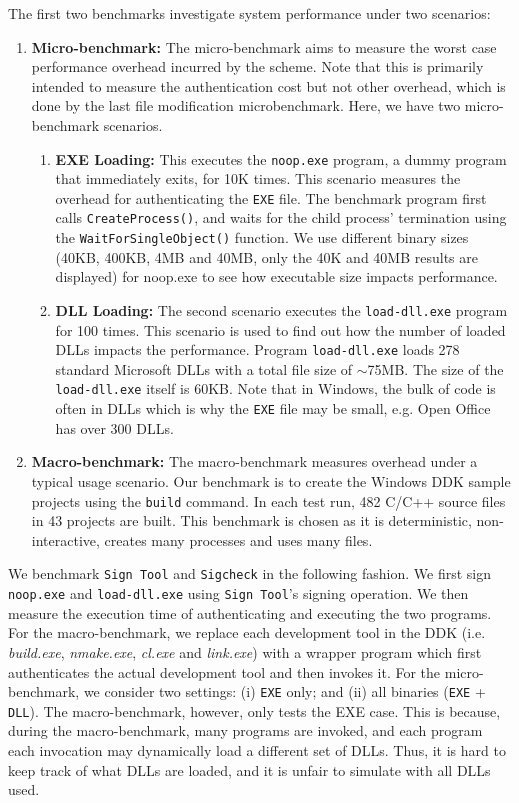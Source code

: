 The first two benchmarks investigate system performance under
two scenarios:
\begin{enumerate}
\item {\bf Micro-benchmark:}
The micro-benchmark aims to measure the worst case performance overhead
incurred by the scheme.
Note that this is primarily intended to measure the authentication cost
but not other overhead, which is done by the last file modification
microbenchmark.
Here, we have two micro-benchmark scenarios.
\begin{enumerate}
\item {\bf EXE Loading:}
This executes the {\tt noop.exe} program, a dummy program
that immediately exits, for 10K times.
This scenario measures the overhead for authenticating the
{\tt EXE} file.
The benchmark program first calls {\tt CreateProcess()},
and waits for the child process' termination using the {\tt WaitForSingleObject()} function.
We use different binary sizes (40KB, 400KB, 4MB and 40MB, only the 40K and 40MB
results are displayed)
for noop.exe to see how executable size impacts performance.
\item {\bf DLL Loading:}
The second scenario executes the {\tt load-dll.exe} program for 100 times.
This scenario is used to find out how the number of loaded DLLs impacts the performance.
Program {\tt load-dll.exe} loads 278 standard Microsoft
DLLs with a total file size of $\sim$75MB.
The size of the {\tt load-dll.exe} itself is 60KB.
Note that in Windows, the bulk of code is often in DLLs which is why the
{\tt EXE} file may be small, e.g. Open Office has over 300 DLLs.
\end{enumerate}

\item {\bf Macro-benchmark:}
The macro-benchmark measures overhead under a typical usage scenario.
Our benchmark is to create the Windows DDK sample projects
using the {\tt build} command.
In each test run, 482 C/C++ source files in 43 projects are built.
This benchmark is chosen as it is deterministic, non-interactive, creates
many processes and uses many files.
\end{enumerate}

We benchmark {\tt Sign Tool} and {\tt Sigcheck} in the following fashion.
We first sign {\tt noop.exe} and {\tt load-dll.exe} using
{\tt Sign Tool}'s signing operation.
We then measure the execution time of
authenticating and executing the two programs.
For the macro-benchmark, we replace each development tool in the DDK
(i.e. {\it build.exe}, {\it nmake.exe}, {\it cl.exe} and {\it link.exe})
with a wrapper program which first authenticates the actual development
tool and then invokes it.
For the micro-benchmark, we consider two settings:
(i) {\tt EXE} only; and (ii) all binaries ({\tt EXE} + {\tt DLL}).
The macro-benchmark, however, only tests the EXE case.
This is because, during the macro-benchmark, many programs are invoked,
and each program each invocation may dynamically load a different set of DLLs.
Thus, it is hard to keep track of what DLLs are loaded, and it is
unfair to simulate with all DLLs used.

